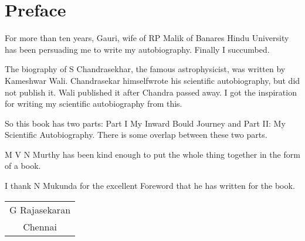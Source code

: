 \chapter{Preface}

For more than ten years, Gauri, wife of RP Malik of Banares Hindu Universi\-ty has been persuading me to write my autobio\-graphy. Finally I succumbed.

The biography of S Chandrasekhar, the famous astrophysicist, was
written by Kameshwar Wali. Chandrasekar himself\break wrote his scientific
autobiography, but did not publish it. Wali published it after Chandra
passed away. I got the inspiration for writing my scientific autobio\-graphy
from this.

So this book has two parts: Part I My Inward Bould Journey and Part II:
My Scientific Autobiography. There is some overlap between these two
parts.

M V N Murthy has been kind enough to put the whole thing together in the 
form of a book.

I thank N Mukunda for the excellent Foreword that he has written for 
the book.

\vskip 1cm
\begin{flushright}
\begin{tabular}{c}
G Rajasekaran\\
Chennai
\end{tabular}
\end{flushright}
